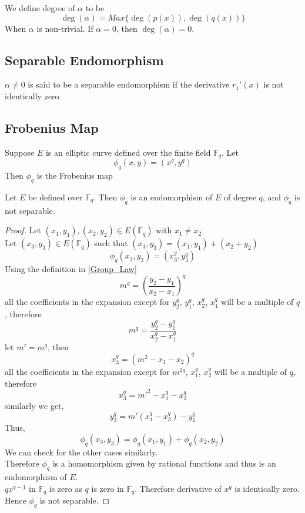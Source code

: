 \begin{definition}
    We define degree of $\alpha$ to be
    \begin{equation*}
         \operatorname{deg}(\alpha) = Max\{ \operatorname{deg}(p(x)),  \operatorname{deg}(q(x))\}
    \end{equation*}
    When $\alpha$ is non-trivial. If $\alpha = 0$, then $ \operatorname{deg}(\alpha) = 0$.
\end{definition}

\subsection{Separable Endomorphism}
\begin{definition}
    $\alpha \neq 0$ is said to be a separable endomorphism if the derivative $r_1'(x)$ is not identically zero
\end{definition}

\subsection{Frobenius Map}
\begin{definition}
    Suppose $E$ is an elliptic curve defined over the finite field $\mathbb{F}_q$. Let
    \begin{equation}
        \phi_q(x, y) = (x^q, y^q)
    \end{equation}
    Then $\phi_q$ is the Frobenius map 
\end{definition}

\begin{lemma}
    Let $E$ be defined over $\mathbb{F}_q$. Then $\phi_q$ is an endomorphism of $E$ of degree $q$, and $\phi_q$ is not separable.
\end{lemma}
\begin{proof}
   Let $(x_1, y_1), (x_2, y_2) \in E(\mathbb{F}_q)$ with $x_1 \neq x_2$\\
   Let $(x_3, y_3) \in  E(\mathbb{F}_q) $ such that $(x_3, y_3) = (x_1, y_1) + (x_2 + y_2)$
   \[\phi_q(x_3, y_3) = (x_3^q, y_3^q)\]
   Using the definition in \ref{Group_Law}
   \[m^q = \left(\frac{y_2-y_1}{x_2-x_1}\right)^q\]
   all the coefficients in the expansion except for $y_2^q$, $y_1^q$, $x_2^q$, $x_1^q$ will be a multiple of $q$, therefore
   \[ m^q = \frac{y_2^q - y_1^q}{x_2^q - x_1^q}\]
   let $m' = m^q$, then
   \[x_3^q = (m^2 - x_1 - x_2)^q\]
   all the coefficients in the expansion except for $m^{2q}$, $x_1^q$, $x_2^q$ will be a multiple of $q$, therefore
   \[x_3^q = m'^2 - x_1^q - x_2^q\]
   similarly we get,
   \[y_3^q = m'(x_1^q - x_3^q) - y_1^q\]
   Thus,
   \[\phi_q(x_3, y_3) = \phi_q(x_1, y_1) + \phi_q(x_2, y_2)\]
   We can check for the other cases similarly.\\
   Therefore $\phi_q$ is a homomorphism given by rational functions and thus is an endomorphism of $E$. \\
  $qx^{q-1}$ in $\mathbb{F}_q$ is zero as $q$ is zero in $\mathbb{F}_q$. Therefore derivative of $x^q$ is identically zero. Hence $\phi_q$ is not separable.
\end{proof}


